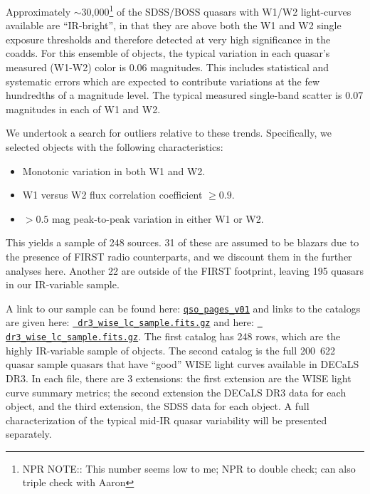 \documentclass[11pt,a4paper]{article}
\begin{document}
Approximately $\sim$30,000\footnote{NPR NOTE:: This number seems low to
me; NPR to double check; can also triple check with Aaron} of the
SDSS/BOSS quasars with W1/W2 light-curves available are
``IR-bright'', in that they are above both the W1 and W2
single exposure thresholds and therefore detected at very high
significance in the coadds. For this ensemble of objects, the typical
variation in each quasar's measured (W1-W2) color is 0.06 magnitudes.
This includes statistical and systematic errors which are expected to
contribute variations at the few hundredths of a magnitude level. The
typical measured single-band scatter is 0.07 magnitudes in each of W1
and W2.

We undertook a search for outliers relative to these trends.
Specifically, we selected objects with the following characteristics:
\begin{itemize}
    \item Monotonic variation in both W1 and W2.
    \item W1 versus W2 flux correlation coefficient $\geq0.9$.
    \item $>0.5$ mag peak-to-peak variation in either W1 or W2.
\end{itemize}
This yields a sample of 248 sources. 31 of these are assumed to be
blazars due to the presence of FIRST radio counterparts, and we
discount them in the further analyses here. Another 22 are outside of
the FIRST footprint, leaving 195 quasars in our IR-variable sample.

A link to our sample can be found here:
\href{http://portal.nersc.gov/project/cosmo/temp/ameisner/qso\_pages\_v01/}
{\tt qso\_pages\_v01} and links to the catalogs are given here:
\href{http://portal.nersc.gov/project/cosmo/temp/ameisner/dr3_wise_lc_sample.fits.gz}{{\tt
dr3\_wise\_lc\_sample.fits.gz}} and here:
\href{http://portal.nersc.gov/project/cosmo/temp/ameisner/dr3_wise_lc_metrics_all_qso.fits.gz}{{\tt
dr3\_wise\_lc\_sample.fits.gz}}.  The first catalog has 248 rows,
which are the highly IR-variable sample of objects.  The second
catalog is the full \hbox{200 622} quasar sample quasars that have
``good'' WISE light curves available in DECaLS DR3. In each file,
there are 3 extensions: the first extension are the WISE light curve
summary metrics; the second extension the DECaLS DR3 data for each
object, and the third extension, the SDSS data for each object.  A full
characterization of the typical mid-IR quasar variability will be
presented separately.
\end{document}
